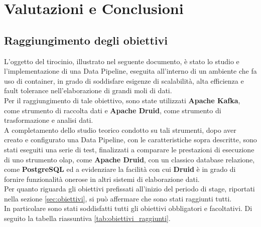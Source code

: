\chapter{Valutazioni e Conclusioni}
\label{cap:conclusioni}
\section{Raggiungimento degli obiettivi}
L'oggetto del tirocinio, illustrato nel seguente documento, è stato lo studio e l'implementazione di una \gls{Data Pipeline}{}, eseguita all'interno di un ambiente che fa uso di \gls{container}{}, in grado di 
soddisfare esigenze di scalabilità, alta efficienza e \gls{fault tolerance}{} nell'elaborazione di grandi moli di dati.\\
Per il raggiungimento di tale obiettivo, sono state utilizzati \textbf{Apache Kafka}, come strumento di raccolta dati e 
\textbf{Apache Druid}, come strumento di trasformazione e analisi dati.\\
A completamento dello studio teorico condotto su tali strumenti, 
dopo aver creato e configurato una \gls{Data Pipeline}{}, con le caratteristiche sopra descritte, 
sono stati eseguiti una serie di test, finalizzati a comparare 
le prestazioni di esecuzione di uno strumento \gls{olap}{}, come \textbf{Apache Druid}, con 
un classico database relazione, come \textbf{PostgreSQL} ed a evidenziare la facilità con cui \textbf{Druid} è in grado di 
fornire funzionalità onerose in altri sistemi di elaborazione dati.\\
Per quanto riguarda gli obiettivi prefissati all'inizio del periodo di stage, riportati nella sezione \ref{sec:obiettivi}, si può affermare che sono stati raggiunti tutti.\\
In particolare sono stati soddisfatti tutti gli obiettivi obbligatori e facoltativi. Di seguito la tabella riassuntiva \ref{tab:obiettivi_raggiunti}.\\
